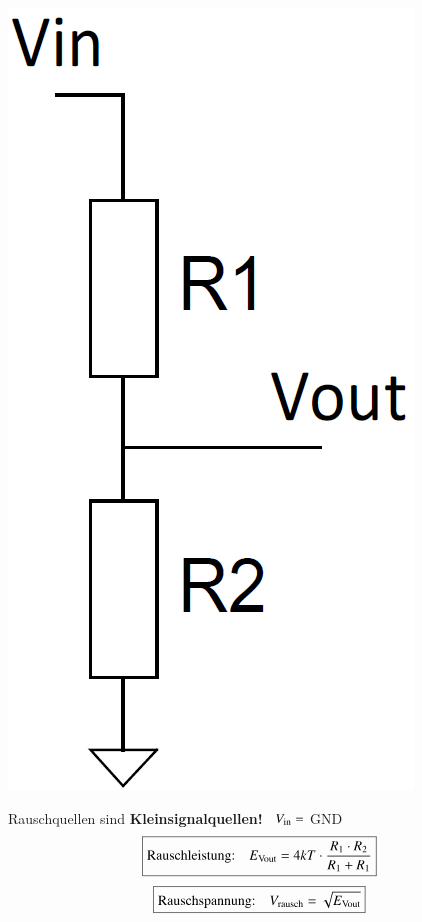 \begin{minipage}[c]{0.13\columnwidth}
    \includegraphics[width=\columnwidth]{images/rauschen_spannungsteiler.png}
\end{minipage}
\hfill
\begin{minipage}[c]{0.8\columnwidth}
    Rauschquellen sind \textbf{Kleinsignalquellen!} \textrightarrow\ $V_{\rm in} =$ GND
    $$ \boxed{\text{Rauschleistung:} \quad E_{\rm Vout} = 4 k T \cdot \frac{R_1 \cdot R_2}{R_1 + R_1} } $$
    $$ \boxed{\text{Rauschspannung:} \quad V_{\rm rausch} = \sqrt{E_{\rm Vout} } } $$
\end{minipage}



